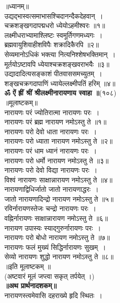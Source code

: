 \documentclass[twoside,top=1.7cm, bottom=1.7cm, outer=1cm,landscape, inner=1.5cm,a5paper,]{book}
\begin{document}
\begin{center}
॥ध्यानम्॥\\
उद्यद्भास्वत्समाभासश्चिदानन्दैकदेहवान्~।\\
चक्रशङ्खगदापद्मधरो ध्येयोऽहमीश्वरः ॥१॥\\[10pt]
लक्ष्मीधराभ्यामाश्लिष्टः स्वमूर्तिगणमध्यगः~।\\
ब्रह्मवायुशिवाहीशविपैः शक्रादिकैरपि ॥२॥\\[10pt]
सेव्यमानोऽधिकं भक्त्या नित्यनिश्शेषभक्तिमान्~।\\
मूर्तयोऽष्टावपि ध्येयाश्चक्रशङ्खवराभयैः ॥३॥\\[10pt]
\newpage
उद्यादादित्यसङ्काशं पीतवाससमच्युतम्~।\\
शङ्खचक्रगदापाणिं ध्यायेल्लक्ष्मीपतिं हरिम् ॥४॥\\[10pt]
{\bfseries ॐ ऐं ह्रीं श्रीं श्रीलक्ष्मीनारायणाय स्वाहा ॥}(१०८)\\
॥मूलाष्टकम्॥\\
नारायणः परं ज्योतिरात्मा नारायणः परः~।\\
नारायणः परं ब्रह्म नारायण नमोऽस्तु ते ॥१॥\\[10pt]
नारायणः परो देवो धाता नारायणः परः~।\\
नारायणः परो ध्याता नारायण नमोऽस्तु ते ॥२॥\\[10pt]
\newpage
नारायणः परं धाम ध्यानं नारायणः परः~।\\
नारायणः परो धर्मो नारायण नमोऽस्तु ते ॥३॥\\[10pt]
नारायणः परो देवो विद्या नारायणः परः~।\\
विश्वं नारायणः साक्षान्नारायण नमोऽस्तु ते ॥४॥\\[10pt]
नारायणाद्विधिर्जातो जातो नारायणाद्धरः~।\\
जातो नारायणादिन्द्रो नारायण नमोऽस्तु ते ॥५॥\\[10pt]
रविर्नारायणस्तेजः चन्द्रो नारायणः परः~।\\
वह्निर्नारायणः साक्षान्नारायण नमोऽस्तु ते ॥६॥\\[10pt]
\newpage
नारायण उपास्यः स्याद्गुरुर्नारायणः परः~।\\
नारायणः परो बोधो नारायण नमोऽस्तु ते ॥७‍॥\\[10pt]
नारायणः फलं मुख्यं सिद्धिर्नारायणः सुखम्~।\\
सेव्यो नारायणः शुद्धो नारायण नमोऽस्तु ते ॥८॥\\
॥इति मूलाष्टकम् ॥\\
(अष्टवारं मूलं जप्त्वा सकृत्  तर्पयेत् ।)\\
\newpage
{\bfseries ॥अथ प्रार्थनादशकम्॥}\\
नारायणस्त्वमेवासि दहराख्ये हृदि स्थितः~।\\

\end{center}
\end{document}
